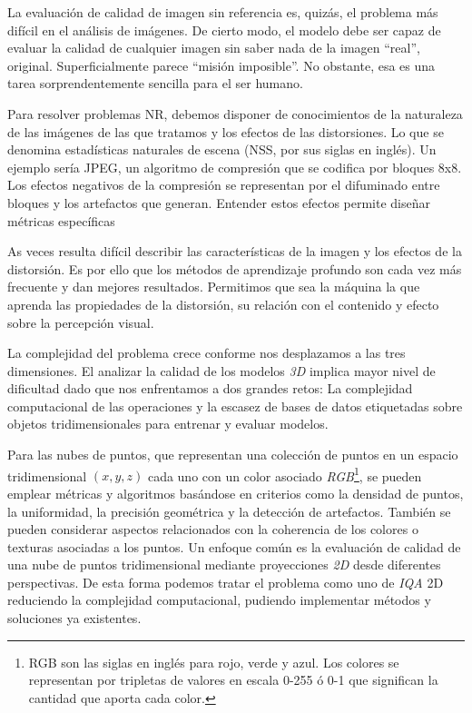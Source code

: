 La evaluación de calidad de imagen sin referencia es, quizás, el problema 
más difícil en el análisis de imágenes. De cierto modo, el modelo debe ser 
capaz de evaluar la calidad de cualquier imagen sin saber nada de la imagen ``real'', original. 
Superficialmente parece ``misión imposible''. No obstante, esa 
es una tarea sorprendentemente sencilla para el ser humano\cite{Wang2006ModernIQ}. 

Para resolver problemas NR, debemos disponer de conocimientos de la naturaleza de las imágenes 
de las que tratamos y los efectos de las distorsiones. Lo que se denomina 
estadísticas naturales de escena (NSS, por sus siglas en inglés). Un ejemplo 
sería JPEG, un algoritmo de compresión que se codifica por bloques 8x8. Los efectos
negativos de la compresión se representan por el difuminado entre bloques y los artefactos que generan.
Entender estos efectos permite diseñar métricas específicas\cite{SpatialDomainForJPEG, FrecuencyDomainForJPEG}

As veces resulta difícil describir las características de la imagen y los efectos 
de la distorsión. Es por ello que los métodos de aprendizaje profundo son cada vez 
más frecuente y dan mejores resultados. Permitimos que sea la máquina la que aprenda 
las propiedades de la distorsión, su relación con el contenido y efecto sobre la 
percepción visual\cite{Hallucinated-IQA, BIQA, DIPIQA}. 

La complejidad del problema crece conforme nos desplazamos a las tres dimensiones. 
El analizar la calidad de los modelos \emph{3D} implica mayor nivel de dificultad 
dado que nos enfrentamos a dos grandes retos: La complejidad computacional 
de las operaciones y la escasez de bases de datos etiquetadas
sobre objetos tridimensionales para entrenar y evaluar modelos. 

 
Para las nubes de puntos, que representan una colección de puntos en un espacio 
tridimensional $(x,y,z)$ cada uno con un color asociado \emph{RGB}\footnote{
  RGB son las siglas en inglés para rojo, verde y azul. Los colores se representan 
  por tripletas de valores en escala 0-255 ó 0-1 que significan la cantidad que aporta 
  cada color. 
}, se pueden emplear métricas y algoritmos basándose en criterios como la 
densidad de puntos, la uniformidad, la precisión geométrica y la detección de artefactos.
También se pueden considerar aspectos relacionados con la coherencia de los colores 
o texturas asociadas a los puntos\cite{NR3DQA, StructureGuidedResampling, GPA-NET}.
Un enfoque común es la evaluación de calidad de una nube de puntos tridimensional 
mediante proyecciones \emph{2D} desde diferentes perspectivas\cite{IT-PCQA, VQA-PC, MM-PCQA}. 
De esta forma podemos tratar el problema como uno de \emph{IQA} 2D reduciendo la 
complejidad computacional, pudiendo implementar métodos y soluciones ya existentes.

